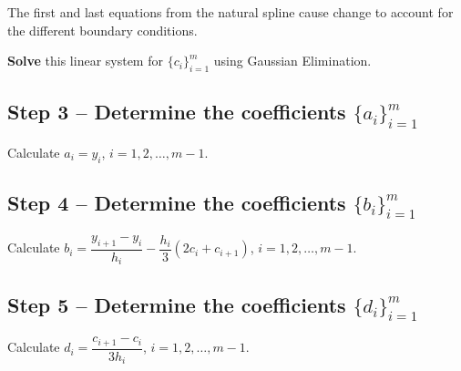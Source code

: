 The first and last equations from the natural spline cause change to account for the different boundary conditions.

\textbf{Solve} this linear system for \( \{ c_i \}_{i=1}^{m} \) using Gaussian Elimination.

\subsection*{Step 3 -- Determine the coefficients \( \{ a_i \}_{i=1}^{m} \)}

Calculate \( a_i = y_i \), \( i = 1, 2, \dots, m - 1 \).

\subsection*{Step 4 -- Determine the coefficients \( \{ b_i \}_{i=1}^{m} \)}

Calculate \( b_i = \dfrac{y_{i+1} - y_i}{h_i} - \dfrac{h_i}{3}(2c_i + c_{i+1}) \), \( i = 1, 2, \dots, m - 1 \).

\subsection*{Step 5 -- Determine the coefficients \( \{ d_i \}_{i=1}^{m} \)}

Calculate \( d_i = \dfrac{c_{i+1} - c_i}{3h_i} \), \( i = 1, 2, \dots, m - 1 \).